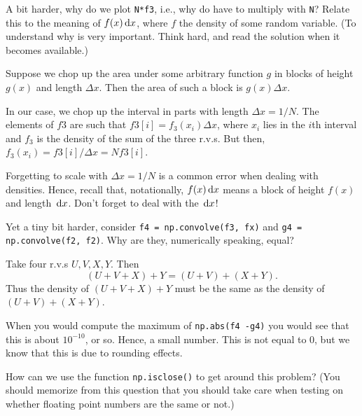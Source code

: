 \begin{exercise}
A bit harder, why do we plot \texttt{N*f3}, i.e., why do have to multiply with \texttt{N}? Relate this to the meaning of $f(x)\,\textrm{d}x$, where $f$ the density of some random variable.
(To understand why is very important. Think hard, and read the solution when it becomes available.)
\begin{solution}
  Suppose we chop up the area under some arbitrary  function $g$ in blocks of height $g(x)$ and length $\Delta x$.
  Then the area of such a block is $g(x) \Delta x$.


  In our case, we chop up the interval in parts with length $\Delta x = 1/N$.
  The elements of $f3$ are such that $f3[i] = f_{3}(x_{i}) \Delta x$, where $x_{i}$ lies in the $i$th interval and $f_{3}$ is the density of the sum of the three r.v.s. But then, $f_{3}(x_{i}) = f3[i]/\Delta x = N f3[i]$.

  Forgetting to scale with $\Delta x = 1/N$ is a common error when dealing with densities.
  Hence, recall that, notationally, $f(x) \,\textrm{d}x$ means a block of height $f(x)$ and length $\,\textrm{d}x$. Don't forget to deal with the $\,\textrm{d}x$!
\end{solution}
\end{exercise}

\begin{exercise}
Yet a tiny bit harder, consider \texttt{f4 = np.convolve(f3, fx)} and \texttt{g4 = np.convolve(f2, f2)}. Why are they, numerically speaking,  equal?
\begin{solution}
Take four r.v.s $U, V, X, Y$. Then
  \begin{equation}
    \label{eq:15}
(U+V+X) + Y = (U+V) + (X+Y).
  \end{equation}
Thus the density of $(U+V+X) + Y$ must be the same as the density of $(U+V) + (X+Y)$.
\end{solution}
\end{exercise}


\begin{exercise}
When you would compute the maximum of \texttt{np.abs(f4 -g4)} you would see that this is about $10^{-10}$, or so.
Hence, a small number.
This is not equal to 0, but we know that this is due to rounding effects.

How can we use the function \texttt{np.isclose()} to get around this problem?
(You should memorize from this question that you should take care when testing on whether floating point numbers are the same or not.)
\end{exercise}
